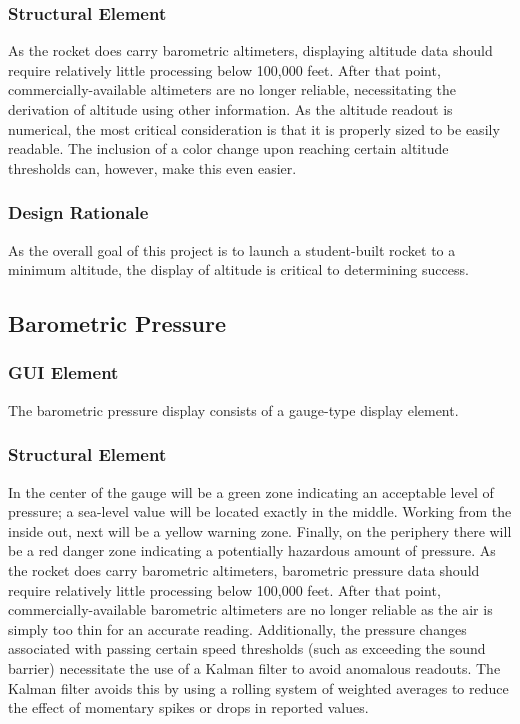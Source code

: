 \documentclass[journal,10pt,onecolumn,compsoc]{IEEEtran}
\begin{document}
		\subsubsection{Structural Element}
			As the rocket does carry barometric altimeters, displaying altitude data should require relatively little processing below 100,000 feet.
			After that point, commercially-available altimeters are no longer reliable, necessitating the derivation of altitude using other information.
			As the altitude readout is numerical, the most critical consideration is that it is properly sized to be easily readable.
			The inclusion of a color change upon reaching certain altitude thresholds can, however, make this even easier.
			
		\subsubsection{Design Rationale}
			As the overall goal of this project is to launch a student-built rocket to a minimum altitude, the display of altitude is critical to determining success.

	\subsection{Barometric Pressure}

		\subsubsection{GUI Element}
			The barometric pressure display consists of a gauge-type display element.
					
		\subsubsection{Structural Element}
			In the center of the gauge will be a green zone indicating an acceptable level of pressure; a sea-level value will be located exactly in the middle.
			Working from the inside out, next will be a yellow warning zone.
			Finally, on the periphery there will be a red danger zone indicating a potentially hazardous amount of pressure.
			As the rocket does carry barometric altimeters, barometric pressure data should require relatively little processing below 100,000 feet.
			After that point, commercially-available barometric altimeters are no longer reliable as the air is simply too thin for an accurate reading.
			Additionally, the pressure changes associated with passing certain speed thresholds (such as exceeding the sound barrier) necessitate the use of a Kalman filter to avoid anomalous readouts.
			The Kalman filter avoids this by using a rolling system of weighted averages to reduce the effect of momentary spikes or drops in reported values.
			
\end{document}
